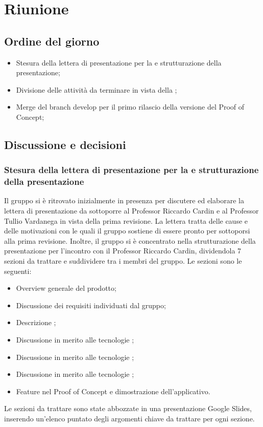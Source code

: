 \section{Riunione}
\subsection{Ordine del giorno}
\begin{itemize}
	\item Stesura della lettera di presentazione per la \RTB e strutturazione della presentazione;
	\item Divisione delle attività da terminare in vista della \RTB;
	\item Merge del branch develop per il primo rilascio della versione del Proof of Concept;
\end{itemize}

\subsection{Discussione e decisioni}
\subsubsection{Stesura della lettera di presentazione per la \RTB e strutturazione della presentazione}
\par Il gruppo si è ritrovato inizialmente in presenza per discutere ed elaborare la lettera di presentazione da sottoporre al Professor Riccardo Cardin e al Professor Tullio Vardanega in vista della prima revisione. 
La lettera tratta delle cause e delle motivazioni con le quali il gruppo sostiene di essere pronto per sottoporsi alla prima revisione.
Inoltre, il gruppo si è concentrato nella strutturazione della presentazione per l'incontro con il Professor Riccardo Cardin, dividendola 7 sezioni da trattare e suddividere tra i membri del gruppo. Le sezioni sono le seguenti:
\begin{itemize}
	\item Overview generale del prodotto;
	\item Discussione dei requisiti individuati dal gruppo;
	\item Descrizione ; 
	\item Discussione in merito alle tecnologie ;
	\item Discussione in merito alle tecnologie ;
	\item Discussione in merito alle tecnologie ;
	\item Feature nel Proof of Concept e dimostrazione dell'applicativo.
\end{itemize}
Le sezioni da trattare sono state abbozzate in una presentazione Google Slides, inserendo un'elenco puntato degli argomenti chiave da trattare per ogni sezione.

